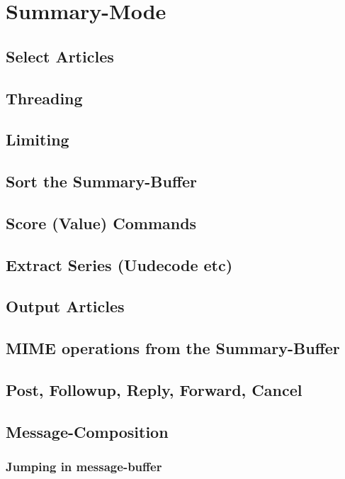 \documentclass{article}
\begin{document}
\section*{Summary-Mode}
\SummaryModeGeneral
    \subsection*{Select Articles}
    \SelectArticles
%
    \subsection*{Threading}
    \Threading
%
    \subsection*{Limiting}
    \Limiting
    \subsection*{Sort the Summary-Buffer}
    \SortSummary
    \subsection*{Score (Value) Commands}
    \Scoring
    \subsection*{Extract Series (Uudecode etc)}
    \ExtractSeries
    \subsection*{Output Articles}
    \OutputArticles
    \subsection*{MIME operations from the Summary-Buffer}
    \MIMESummary     
%
    \subsection*{Post, Followup, Reply, Forward, Cancel}
    \PostReplyetc
    \subsection*{Message-Composition}
    \MsgCompositionGeneral
        \subsubsection*{Jumping in message-buffer}
        \MsgCompositionMovementArticle
\end{document}
